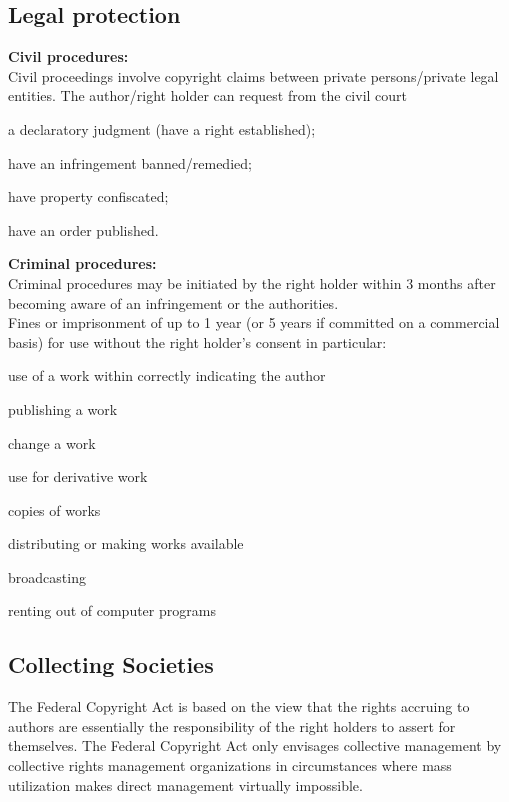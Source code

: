 \subsection{Legal protection}
\textbf{Civil procedures:} \\
Civil proceedings involve copyright claims between private persons/private legal entities.
The author/right holder can request from the civil court
\begin{compactitem}
	\item a declaratory judgment (have a right established);
	\item have an infringement banned/remedied;
	\item have property confiscated;
	\item have an order published.
\end{compactitem}
\textbf{Criminal procedures:} \\
Criminal procedures may be initiated by the right holder within 3 months after becoming aware of an infringement or the authorities. \\
Fines or imprisonment of up to 1 year (or 5 years if committed on a commercial basis) for use without the right holder’s consent in particular:
\begin{compactitem}
	\item use of a work within correctly indicating the author
	\item publishing a work
	\item change a work
	\item use for derivative work
	\item copies of works
	\item distributing or making works available
	\item broadcasting
	\item renting out of computer programs
\end{compactitem}

\subsection{Collecting Societies}
The Federal Copyright Act is based on the view that the rights accruing to authors are essentially the responsibility of the right holders to assert for themselves. The Federal Copyright Act only envisages collective management by collective rights management organizations in circumstances where mass utilization makes direct management virtually impossible.

